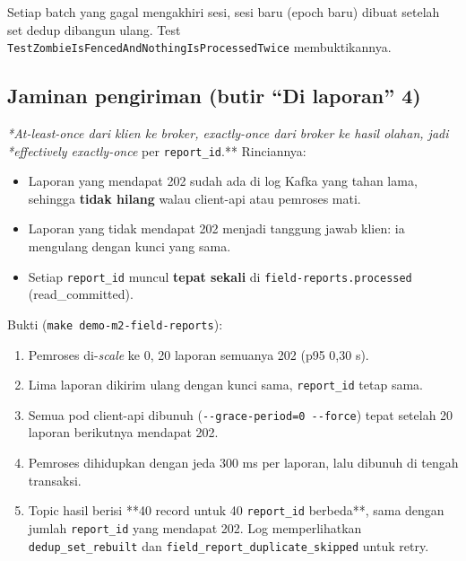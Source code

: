 \begin{itemize}
\begin{itemize}
Setiap batch yang gagal mengakhiri sesi, sesi baru (epoch baru) dibuat setelah set dedup dibangun ulang. Test
\texttt{Test\allowbreak{}Zombie\allowbreak{}Is\allowbreak{}Fenced\allowbreak{}And\allowbreak{}Nothing\allowbreak{}Is\allowbreak{}Processed\allowbreak{}Twice} membuktikannya.
\end{itemize}
\end{itemize}

\subsection{Jaminan pengiriman (butir ``Di laporan'' 4)}

\emph{*At-least-once dari klien ke broker, exactly-once dari broker ke hasil olahan, jadi *effectively exactly-once} per \texttt{report\_\allowbreak{}id}.** Rinciannya:


\begin{itemize}
\item Laporan yang mendapat 202 sudah ada di log Kafka yang tahan lama, sehingga \textbf{tidak hilang} walau client-api atau pemroses mati.
\item Laporan yang tidak mendapat 202 menjadi tanggung jawab klien: ia mengulang dengan kunci yang sama.
\item Setiap \texttt{report\_\allowbreak{}id} muncul \textbf{tepat sekali} di \texttt{field-\allowbreak{}reports.\allowbreak{}processed} (read\_committed).
\end{itemize}

Bukti (\texttt{make demo-\allowbreak{}m2-\allowbreak{}field-\allowbreak{}reports}):


\begin{enumerate}
\item Pemroses di-\emph{scale} ke 0, 20 laporan semuanya 202 (p95 0,30 s).
\item Lima laporan dikirim ulang dengan kunci sama, \texttt{report\_\allowbreak{}id} tetap sama.
\item Semua pod client-api dibunuh (\texttt{-\allowbreak{}-\allowbreak{}grace-\allowbreak{}period=\allowbreak{}0 -\allowbreak{}-\allowbreak{}force}) tepat setelah 20 laporan berikutnya mendapat 202.
\item Pemroses dihidupkan dengan jeda 300 ms per laporan, lalu dibunuh di tengah transaksi.
\item Topic hasil berisi **40 record untuk 40 \texttt{report\_\allowbreak{}id} berbeda**, sama dengan jumlah \texttt{report\_\allowbreak{}id} yang mendapat 202. Log memperlihatkan \texttt{dedup\_\allowbreak{}set\_\allowbreak{}rebuilt} dan \texttt{field\_\allowbreak{}report\_\allowbreak{}duplicate\_\allowbreak{}skipped} untuk retry.
\end{enumerate}

